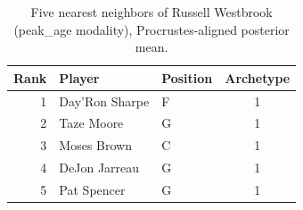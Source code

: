 \begin{table}[htbp]
  \centering\small
  \begin{tabular}{rllc}
    \toprule
    Rank & Player & Position & Archetype \\
    \midrule
    1 & Day'Ron Sharpe & F & 1 \\
    2 & Taze Moore & G & 1 \\
    3 & Moses Brown & C & 1 \\
    4 & DeJon Jarreau & G & 1 \\
    5 & Pat Spencer & G & 1 \\
    \bottomrule
  \end{tabular}
  \caption{Five nearest neighbors of Russell Westbrook (peak_age modality), Procrustes-aligned posterior mean.}
  \label{tab:Russell_Westbrook_neighbors_peak_age}
\end{table}

